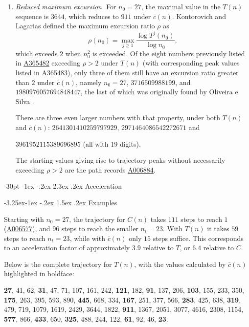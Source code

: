 \documentclass[11pt]{article}
\makeatletter
\renewcommand\section{\@startsection {section}{1}{\z@}
{-30pt \@plus -1ex \@minus -.2ex}
{2.3ex \@plus.2ex}
{\normalfont\normalsize\bfseries\boldmath}}
\renewcommand\subsection{\@startsection{subsection}{2}{\z@}
{-3.25ex\@plus -1ex \@minus -.2ex}
{1.5ex \@plus .2ex}
{\normalfont\normalsize\bfseries\boldmath}}
\theoremstyle{plain}
\theoremstyle{definition}
\theoremstyle{remark}
\newcommand{\seqnum}[1]{\href{https://oeis.org/#1}{\rm \underline{#1}}}
\makeatother
\begin{document}
\begin{enumerate}
\item \emph{Reduced maximum excursion.} For $n_0 = 27$, the maximal value in the $T(n)$ sequence is $3644$, which reduces to $911$ under $\bar{c}(n)$. Kontorovich and Lagarias \cite{KL09} defined the maximum excursion ratio $\rho$ as
\begin{displaymath}
\rho(n_0) = \max_{j \ge 1} \frac{\log T^j(n_0)}{\log n_0},
\end{displaymath}
which exceeds $2$ when $n_0^2$ is exceeded. 
Of the eight numbers previously listed in \seqnum{A365482} exceeding $\rho > 2$ under $T(n)$ (with corresponding peak values listed in \seqnum{A365483}),  
only three of them still have an excursion ratio greater than $2$ under $\bar{c}(n)$, 
namely $n_0 = 27$, $3716509988199$, and $1980976057694848447$, 
the last of which was originally found by Oliveira e Silva \cite{OeS09}. \par
There are three even larger numbers with that property, under both $T(n)$ and $\bar{c}(n)$:
$2641301410259797929$, $2971464086542272671$ and \par $3961952115389696895$ (all with 19 digits). \par
The starting values giving rise to trajectory peaks without necessarily exceeding $\rho > 2$ are the path records \seqnum{A006884}. 
\end{enumerate}

\section{Acceleration}

\subsection{Examples}

Starting with $n_0 = 27$, the trajectory for $C(n)$ takes $111$ steps to reach $1$ (\seqnum{A006577}), and $96$ steps to reach the smaller $n_t = 23$. With $T(n)$ it takes $59$ steps to reach $n_t = 23$, while with $\bar{c}(n)$ only $15$ steps suffice. 
This corresponds to an acceleration factor of approximately $3.9$ relative to $T$, or $6.4$ relative to $C$.

Below is the complete trajectory for $T(n)$, with the values calculated by $\bar{c}(n)$ highlighted in boldface:

\medskip
\noindent
\textbf{27}, 41, 62, \textbf{31}, 47, 71, 107, 161, 242, \textbf{121}, 182, \textbf{91}, 137, 206, \textbf{103}, 155, 233, 350, \textbf{175}, 263, 395, 593, 890, \textbf{445}, 668, 334, \textbf{167}, 251, 377, 566, \textbf{283}, 425, 638, \textbf{319}, 479, 719, 1079, 1619, 2429, 3644, 1822, \textbf{911}, 1367, 2051, 3077, 4616, 2308, 1154, \textbf{577}, 866, \textbf{433}, 650, \textbf{325}, 488, 244, 122, \textbf{61}, 92, 46, \textbf{23}.
\medskip
\end{document}
